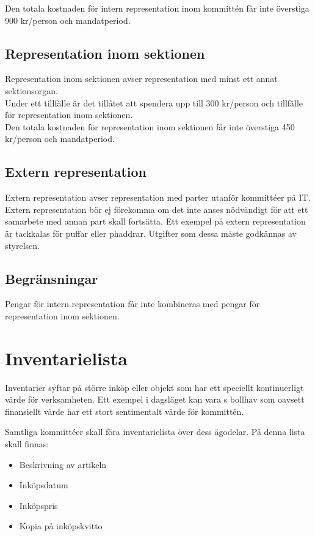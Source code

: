 \documentclass[11pt, includeaddress]{classes/cthit}
\begin{document}
Den totala kostnaden för intern representation inom kommittén får inte överstiga 900 kr/person och mandatperiod. 

\subsection{Representation inom sektionen}
Representation inom sektionen avser representation med minst ett annat sektionsorgan. \\

Under ett tillfälle är det tillåtet att spendera upp till 300 kr/person och tillfälle för representation inom sektionen. \\

Den totala kostnaden för representation inom sektionen får inte överstiga 450 kr/person och mandatperiod.

\subsection{Extern representation}
Extern representation avser representation med parter utanför kommittéer på IT. Extern representation bör ej förekomma om det inte anses nödvändigt för att ett samarbete med annan part skall fortsätta. Ett exempel på extern representation är tackkalas för puffar eller phaddrar. Utgifter som dessa måste godkännas av styrelsen.

\subsection{Begränsningar}
Pengar för intern representation får inte kombineras med pengar för representation inom sektionen.


\section{Inventarielista}
Inventarier syftar på större inköp eller objekt som har ett speciellt kontinuerligt värde för verksamheten. Ett exempel i dagsläget kan vara \NOLLKIT{}s bollhav som oavsett finansiellt värde har ett stort sentimentalt värde för kommittén.

Samtliga kommittéer skall föra inventarielista över dess ägodelar. På denna lista skall finnas:

\begin{itemize}
	\item Beskrivning av artikeln
	\item Inköpsdatum
	\item Inköpspris
	\item Kopia på inköpskvitto
\end{itemize}
\end{document}
